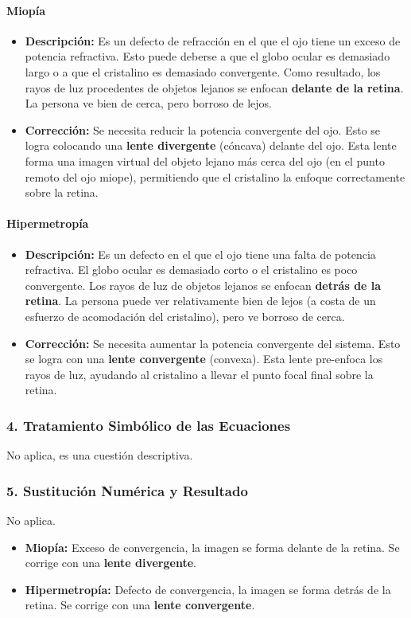 \paragraph*{Miopía}
\begin{itemize}
    \item \textbf{Descripción:} Es un defecto de refracción en el que el ojo tiene un exceso de potencia refractiva. Esto puede deberse a que el globo ocular es demasiado largo o a que el cristalino es demasiado convergente. Como resultado, los rayos de luz procedentes de objetos lejanos se enfocan \textbf{delante de la retina}. La persona ve bien de cerca, pero borroso de lejos.
    \item \textbf{Corrección:} Se necesita reducir la potencia convergente del ojo. Esto se logra colocando una \textbf{lente divergente} (cóncava) delante del ojo. Esta lente forma una imagen virtual del objeto lejano más cerca del ojo (en el punto remoto del ojo miope), permitiendo que el cristalino la enfoque correctamente sobre la retina.
\end{itemize}
\paragraph*{Hipermetropía}
\begin{itemize}
    \item \textbf{Descripción:} Es un defecto en el que el ojo tiene una falta de potencia refractiva. El globo ocular es demasiado corto o el cristalino es poco convergente. Los rayos de luz de objetos lejanos se enfocan \textbf{detrás de la retina}. La persona puede ver relativamente bien de lejos (a costa de un esfuerzo de acomodación del cristalino), pero ve borroso de cerca.
    \item \textbf{Corrección:} Se necesita aumentar la potencia convergente del sistema. Esto se logra con una \textbf{lente convergente} (convexa). Esta lente pre-enfoca los rayos de luz, ayudando al cristalino a llevar el punto focal final sobre la retina.
\end{itemize}

\subsubsection*{4. Tratamiento Simbólico de las Ecuaciones}
No aplica, es una cuestión descriptiva.

\subsubsection*{5. Sustitución Numérica y Resultado}
No aplica.
\begin{cajaresultado}
\begin{itemize}
    \item \textbf{Miopía:} Exceso de convergencia, la imagen se forma delante de la retina. Se corrige con una \textbf{lente divergente}.
    \item \textbf{Hipermetropía:} Defecto de convergencia, la imagen se forma detrás de la retina. Se corrige con una \textbf{lente convergente}.
\end{itemize}
\end{cajaresultado}

